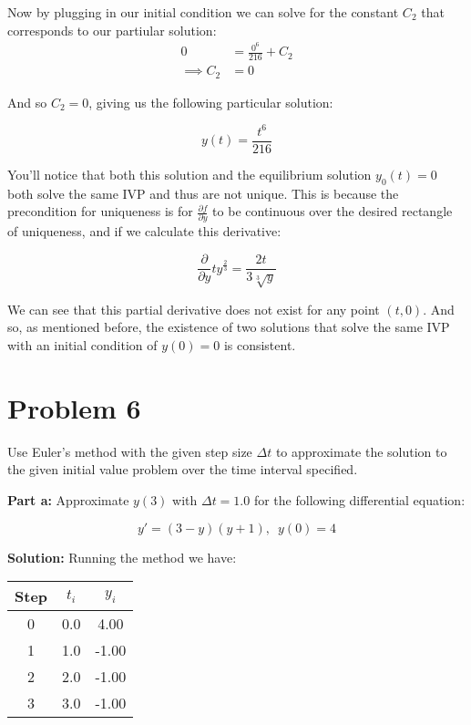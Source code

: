 \documentclass{article}
\begin{document}
Now by plugging in our initial condition we can solve for the constant $C_2$ that corresponds to our partiular solution:
\begin{align*}
    0&=\frac{0^6}{216}+C_2\tag{$(t,y)=(0,0)$}\\
    \implies C_2&=0
\end{align*}

And so $C_2=0$, giving us the following particular solution:

\begin{equation*}
    y(t)=\frac{t^6}{216}
\end{equation*}

You'll notice that both this solution and the equilibrium solution $y_0(t)=0$ both solve the same IVP and thus are not unique. This is because the precondition for uniqueness is for $\frac{\partial f}{\partial y}$ to be continuous over the desired rectangle of uniqueness, and if we calculate this derivative:

\begin{equation*}
    \frac{\partial}{\partial y}ty^{\frac{2}{3}}=\frac{2t}{3\sqrt[3]{y}}
\end{equation*}

We can see that this partial derivative does not exist for any point $(t,0)$. And so, as mentioned before, the existence of two solutions that solve the same IVP with an initial condition of $y(0)=0$ is consistent.

\section*{Problem 6}
Use Euler’s method with the given step size $\Delta t$ to approximate the solution to the given initial value problem over the time interval specified.
\bigskip

\noindent\textbf{Part a:} Approximate $y(3)$ with $\Delta t=1.0$ for the following differential equation:

\begin{equation*}
    y'=(3-y)(y+1),\,\,\,y(0)=4
\end{equation*}
\smallskip

\noindent\textbf{Solution:} Running the method we have:

\begin{center}
\begin{tabular}{c|c|c}
        Step & $t_i$ & $y_i$\\
        \hline
        0 & 0.0 & 4.00\\
        1 & 1.0 & -1.00\\
        2 & 2.0 & -1.00\\
        3 & 3.0 & -1.00\\
\end{tabular}
\end{center}
\end{document}
